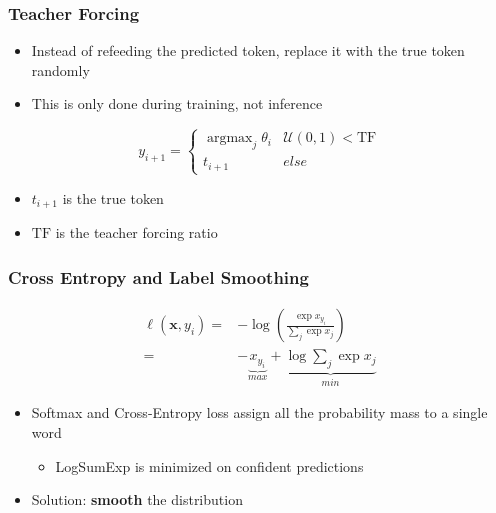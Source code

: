 \documentclass[usenames,dvipsnames]{beamer}
\DeclareMathOperator*{\argmax}{argmax}
\begin{document}
\begin{frame}
\frametitle{Teacher Forcing}
\begin{itemize}
  \item Instead of refeeding the predicted token, replace it with the true token randomly
  \item This is only done during training, not inference
\end{itemize}
\begin{equation*}
  y_{i+1} = \begin{cases}
    \argmax_{j} \theta_i  & \mathcal{U}(0, 1) < \text{TF} \\
    t_{i+1} & else
  \end{cases}
\end{equation*}
\begin{itemize}
  \item $t_{i+1}$ is the true token
  \item $\text{TF}$ is the teacher forcing ratio
\end{itemize}
\end{frame}


\begin{frame}
\frametitle{Cross Entropy and Label Smoothing}
\begin{equation*}
  \begin{split}
    \ell\left(\mathbf{x}, y_i\right) =& - \log \left( \frac{\exp x_{y_i} }{\sum_j \exp x_j} \right) \\
    =& -\underbrace{x_{y_i}}_{max} + \underbrace{\log \sum_j \exp x_j}_{min}
  \end{split}
\end{equation*}
\begin{itemize}
  \item Softmax and Cross-Entropy loss assign all the probability mass to a single word
  \begin{itemize}
    \item LogSumExp is minimized on confident predictions
  \end{itemize}
  \item Solution: \textbf{smooth} the distribution
\end{itemize}
\end{frame}
\end{document}
